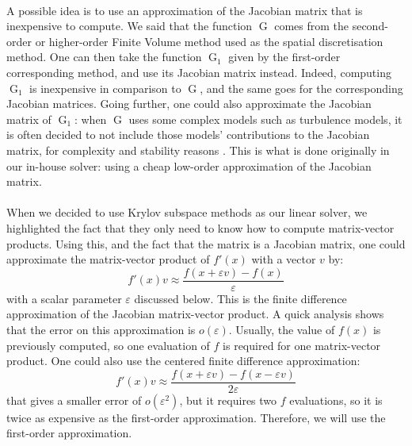       \paragraph{}
      A possible idea is to use an approximation of the Jacobian matrix that is inexpensive to compute.
      We said that the function $\operatorname{G}$ comes from the second-order or higher-order Finite Volume method used as the spatial discretisation method.
      One can then take the function $\operatorname{G}_1$ given by the first-order corresponding method, and use its Jacobian matrix instead.
      Indeed, computing $\operatorname{G}_1$ is inexpensive in comparison to $\operatorname{G}$, and the same goes for the corresponding Jacobian matrices.
      Going further, one could also approximate the Jacobian matrix of $\operatorname{G}_1$: when $\operatorname{G}$ uses some complex models such as turbulence models, it is often decided to not include those models' contributions to the Jacobian matrix, for complexity and stability reasons \cite{ContentOuttierCinnella2013}.
      This is what is done originally in our in-house solver: using a cheap low-order approximation of the Jacobian matrix.

      \paragraph{}
      When we decided to use Krylov subspace methods as our linear solver, we highlighted the fact that they only need to know how to compute matrix-vector products.
      Using this, and the fact that the matrix is a Jacobian matrix, one could approximate the matrix-vector product of $f'\left(x\right)$ with a vector $v$ by:
      \begin{equation}\label{eq:matrix_free}
        f'\left(x\right) v \approx \frac{f\left(x + \varepsilon v\right) - f\left(x\right)}{\varepsilon}
      \end{equation}
      with a scalar parameter $\varepsilon$ discussed below.
      This is the finite difference approximation of the Jacobian matrix-vector product.
      A quick analysis shows that the error on this approximation is $o\left(\varepsilon\right)$.
      Usually, the value of $f\left(x\right)$ is previously computed, so one evaluation of $f$ is required for one matrix-vector product.
      One could also use the centered finite difference approximation:
      \begin{equation}
        f'\left(x\right) v \approx \frac{f\left(x + \varepsilon v\right) - f\left(x - \varepsilon v\right)}{2\varepsilon}
      \end{equation}
      that gives a smaller error of $o\left(\varepsilon^2\right)$, but it requires two $f$ evaluations, so it is twice as expensive as the first-order approximation.
      Therefore, we will use the first-order approximation.

